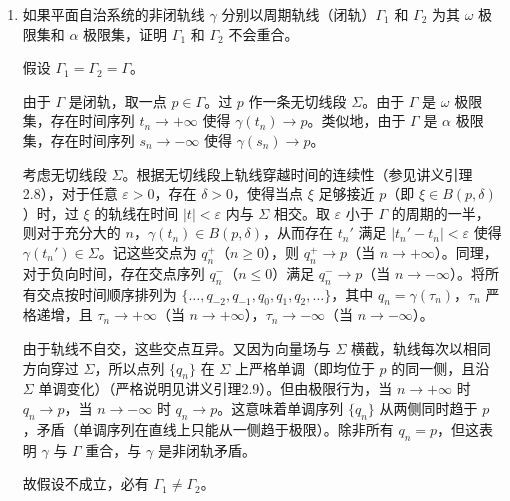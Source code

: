 \begin{enumerate}
    \item[六、] 如果平面自治系统的非闭轨线 \(\gamma\) 分别以周期轨线（闭轨）\(\Gamma_1\) 和 \(\Gamma_2\) 为其 \(\omega\) 极限集和 \(\alpha\) 极限集，证明 \(\Gamma_1\) 和 \(\Gamma_2\) 不会重合。
\begin{proofc}[6的解答]
假设 $\Gamma_1 = \Gamma_2 = \Gamma$。

由于 $\Gamma$ 是闭轨，取一点 $p \in \Gamma$。过 $p$ 作一条无切线段 $\Sigma$。由于 $\Gamma$ 是 $\omega$ 极限集，存在时间序列 $t_n \to +\infty$ 使得 $\gamma(t_n) \to p$。类似地，由于 $\Gamma$ 是 $\alpha$ 极限集，存在时间序列 $s_n \to -\infty$ 使得 $\gamma(s_n) \to p$。

考虑无切线段 $\Sigma$。根据无切线段上轨线穿越时间的连续性（参见讲义引理2.8），对于任意 $\varepsilon > 0$，存在 $\delta > 0$，使得当点 $\xi$ 足够接近 $p$（即 $\xi \in B(p, \delta)$）时，过 $\xi$ 的轨线在时间 $|t| < \varepsilon$ 内与 $\Sigma$ 相交。取 $\varepsilon$ 小于 $\Gamma$ 的周期的一半，则对于充分大的 $n$，$\gamma(t_n) \in B(p, \delta)$，从而存在 $t_n'$ 满足 $|t_n' - t_n| < \varepsilon$ 使得 $\gamma(t_n') \in \Sigma$。记这些交点为 $q_n^+$（$n \geq 0$），则 $q_n^+ \to p$（当 $n \to +\infty$）。同理，对于负向时间，存在交点序列 $q_n^-$（$n \leq 0$）满足 $q_n^- \to p$（当 $n \to -\infty$）。将所有交点按时间顺序排列为 $\{ \dots, q_{-2}, q_{-1}, q_0, q_1, q_2, \dots \}$，其中 $q_n = \gamma(\tau_n)$，$\tau_n$ 严格递增，且 $\tau_n \to +\infty$（当 $n \to +\infty$），$\tau_n \to -\infty$（当 $n \to -\infty$）。

由于轨线不自交，这些交点互异。又因为向量场与 $\Sigma$ 横截，轨线每次以相同方向穿过 $\Sigma$，所以点列 $\{q_n\}$ 在 $\Sigma$ 上严格单调（即均位于 $p$ 的同一侧，且沿 $\Sigma$ 单调变化）（严格说明见讲义引理2.9）。但由极限行为，当 $n \to +\infty$ 时 $q_n \to p$，当 $n \to -\infty$ 时 $q_n \to p$。这意味着单调序列 $\{q_n\}$ 从两侧同时趋于 $p$，矛盾（单调序列在直线上只能从一侧趋于极限）。除非所有 $q_n = p$，但这表明 $\gamma$ 与 $\Gamma$ 重合，与 $\gamma$ 是非闭轨矛盾。

故假设不成立，必有 $\Gamma_1 \neq \Gamma_2$。
\end{proofc}

\end{enumerate}

